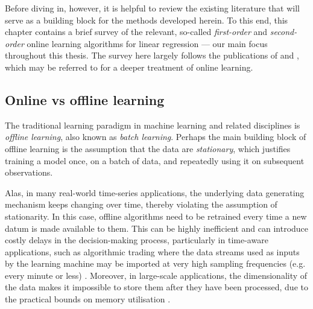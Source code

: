 \begin{mccorrection}
Before diving in, however, it is helpful to review the existing literature that will serve as a building block for the methods developed herein. To this end, this chapter contains a brief survey of the relevant, so-called \emph{first-order} and \emph{second-order} online learning algorithms for linear regression --- our main focus throughout this thesis. The survey here largely follows the publications of \citep{hoi-ol-tutorial} and \citep{ol-survey}, which may be referred to for a deeper treatment of online learning.
\end{mccorrection}

\subsection{Online vs offline learning}

The traditional learning paradigm in machine learning and related disciplines is \emph{offline learning}, also known as \emph{batch learning}. Perhaps the main building block of offline learning is the assumption that the data are \emph{stationary}, which justifies training a model once, on a batch of data, and repeatedly using it on subsequent observations.

Alas, in many real-world time-series applications, the underlying data generating mechanism keeps changing over time, thereby violating the assumption of stationarity. In this case, offline algorithms need to be retrained every time a new datum is made available to them. This can be highly inefficient and can introduce costly delays in the decision-making process, particularly in time-aware applications, such as algorithmic trading where the data streams used as inputs by the learning machine may
be imported at very high sampling frequencies (e.g. every minute or less) \citep{montana}. Moreover, in large-scale applications, the dimensionality of the data makes it impossible to store them after they have been processed, due to the practical bounds on memory utilisation \citep{domingos}.

